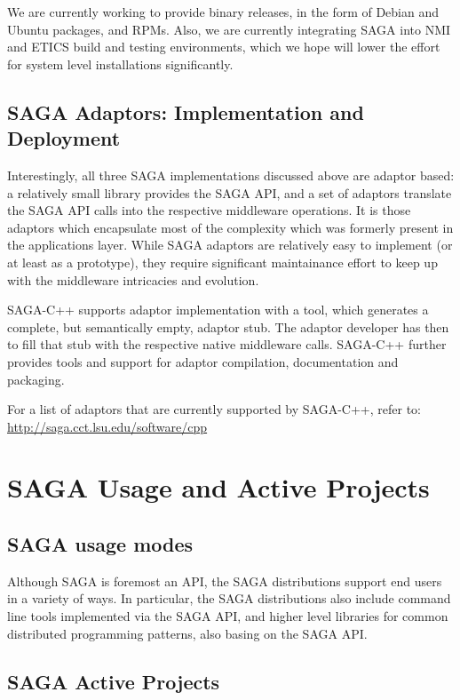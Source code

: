 \documentclass[12pt]{article}
\begin{document}
   We are currently working to provide binary releases, in the form of
   Debian and Ubuntu packages, and RPMs.  Also, we are currently
   integrating SAGA into NMI and ETICS build and testing environments,
   which we hope will lower the effort for system level installations
   significantly.


 \subsection{SAGA Adaptors: Implementation and Deployment}

  Interestingly, all three SAGA implementations discussed above are
  adaptor based: a relatively small library provides the SAGA API, and
  a set of adaptors translate the SAGA API calls into the respective
  middleware operations.  It is those adaptors which encapsulate most
  of the complexity which was formerly present in the applications
  layer.  While SAGA adaptors are relatively easy to implement (or at
  least as a prototype), they require significant maintainance effort
  to keep up with the middleware intricacies and evolution.

  SAGA-C++ supports adaptor implementation with a tool, which
  generates a complete, but semantically empty, adaptor stub.  The
  adaptor developer has then to fill that stub with the respective
  native middleware calls.  SAGA-C++ further provides tools and
  support for adaptor compilation, documentation and packaging.

  For a list of adaptors that are currently supported by SAGA-C++,
  refer to: \url{http://saga.cct.lsu.edu/software/cpp}



\section{SAGA Usage and Active Projects}

 \subsection{SAGA usage modes}

  Although SAGA is foremost an API, the SAGA distributions support end
  users in a variety of ways.  In particular, the SAGA distributions
  also include command line tools implemented via the SAGA API, and
  higher level libraries for common distributed programming patterns,
  also basing on the SAGA API.

\subsection{SAGA Active Projects}
\end{document}
